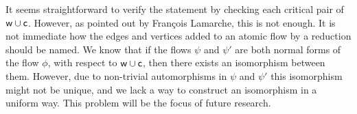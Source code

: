 % 
% 
% 
% 
% 
% 


% 
% 
% 

\begin{remark}
It seems straightforward to verify the statement by checking each critical pair of ${\mathsf w}\cup{\mathsf c}$. However, as pointed out by Fran\c{c}ois Lamarche, this is not enough. It is not immediate how the edges and vertices added to an atomic flow by a reduction should be named. We know that if the flows $\psi$ and $\psi'$ are both normal forms of the flow $\phi$, with respect to ${\mathsf w}\cup{\mathsf c}$, then there exists an isomorphism between them. However, due to non-trivial automorphisms in $\psi$ and $\psi'$ this isomorphism might not be unique, and we lack a way to construct an isomorphism in a uniform way. This problem will be the focus of future research.
\end{remark}

